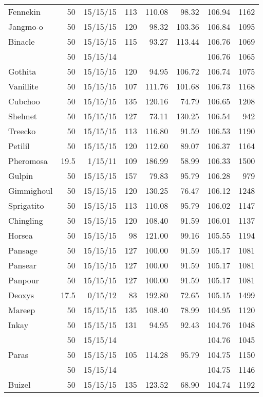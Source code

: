 \begin{longtable}{lrrrrrrr}
Fennekin & 50 & 15/15/15 & 113 & 110.08 & 98.32 & 106.94 & 1162\\
Jangmo-o & 50 & 15/15/15 & 120 & 98.32 & 103.36 & 106.84 & 1095\\
Binacle & 50 & 15/15/15 & 115 & 93.27 & 113.44 & 106.76 & 1069\\
 & 50 & 15/15/14 & & & & 106.76 & 1065\\
Gothita & 50 & 15/15/15 & 120 & 94.95 & 106.72 & 106.74 & 1075\\
Vanillite & 50 & 15/15/15 & 107 & 111.76 & 101.68 & 106.73 & 1168\\
Cubchoo & 50 & 15/15/15 & 135 & 120.16 & 74.79 & 106.65 & 1208\\
Shelmet & 50 & 15/15/15 & 127 & 73.11 & 130.25 & 106.54 &  942\\
Treecko & 50 & 15/15/15 & 113 & 116.80 & 91.59 & 106.53 & 1190\\
Petilil & 50 & 15/15/15 & 120 & 112.60 & 89.07 & 106.37 & 1164\\
Pheromosa & 19.5 & 1/15/11 & 109 & 186.99 & 58.99 & 106.33 & 1500\\
Gulpin & 50 & 15/15/15 & 157 & 79.83 & 95.79 & 106.28 &  979\\
Gimmighoul & 50 & 15/15/15 & 120 & 130.25 & 76.47 & 106.12 & 1248\\
Sprigatito & 50 & 15/15/15 & 113 & 110.08 & 95.79 & 106.02 & 1147\\
Chingling & 50 & 15/15/15 & 120 & 108.40 & 91.59 & 106.01 & 1137\\
Horsea & 50 & 15/15/15 & 98 & 121.00 & 99.16 & 105.55 & 1194\\
Pansage & 50 & 15/15/15 & 127 & 100.00 & 91.59 & 105.17 & 1081\\
Pansear & 50 & 15/15/15 & 127 & 100.00 & 91.59 & 105.17 & 1081\\
Panpour & 50 & 15/15/15 & 127 & 100.00 & 91.59 & 105.17 & 1081\\
Deoxys & 17.5 & 0/15/12 & 83 & 192.80 & 72.65 & 105.15 & 1499\\
Mareep & 50 & 15/15/15 & 135 & 108.40 & 78.99 & 104.95 & 1120\\
Inkay & 50 & 15/15/15 & 131 & 94.95 & 92.43 & 104.76 & 1048\\
 & 50 & 15/15/14 & & & & 104.76 & 1045\\
Paras & 50 & 15/15/15 & 105 & 114.28 & 95.79 & 104.75 & 1150\\
 & 50 & 15/15/14 & & & & 104.75 & 1146\\
Buizel & 50 & 15/15/15 & 135 & 123.52 & 68.90 & 104.74 & 1192\\

\end{longtable}
